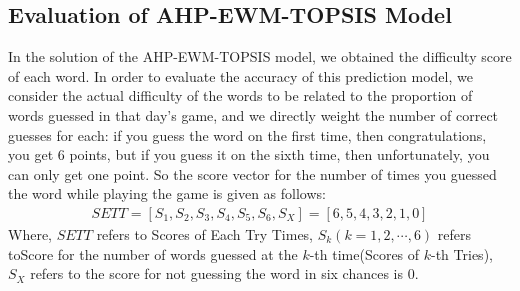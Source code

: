 \documentclass[12pt]{article}  %
\begin{document}
\subsection{Evaluation of AHP-EWM-TOPSIS Model}
In the solution of the AHP-EWM-TOPSIS model, we obtained the difficulty score of each word. In order to evaluate the accuracy of this prediction model, we consider the actual difficulty of the words to be related to the proportion of words guessed in that day's game, and we directly weight the number of correct guesses for each: if you guess the word on the first time, then congratulations, you get 6 points, but if you guess it on the sixth time, then unfortunately, you can only get one point. So the score vector for the number of times you guessed the word while playing the game is given as follows:
\begin{eqnarray}
SETT=[S_1,S_2,S_3,S_4,S_5,S_6,S_X]=[6,5,4,3,2,1,0]
\end{eqnarray}
Where, $SETT$ refers to Scores of Each Try Times, $S_k(k=1,2,\cdots,6)$ refers toScore for the number of words guessed at the $k$-th time(Scores of $k$-th Tries), $S_X$ refers to the score for not guessing the word in six chances is 0.
\end{document}
